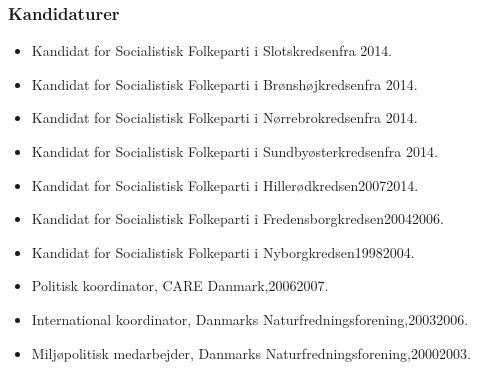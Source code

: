 \documentclass[11pt, a4paper]{awesome-cv}
\begin{document}
\begin{cvletter}
\subsubsection*{Kandidaturer}
\begin{itemize}
\item Kandidat for Socialistisk Folkeparti i Slotskredsenfra 2014.
\item Kandidat for Socialistisk Folkeparti i Brønshøjkredsenfra 2014.
\item Kandidat for Socialistisk Folkeparti i Nørrebrokredsenfra 2014.
\item Kandidat for Socialistisk Folkeparti i Sundbyøsterkredsenfra 2014.
\item Kandidat for Socialistisk Folkeparti i Hillerødkredsen20072014.
\item Kandidat for Socialistisk Folkeparti i Fredensborgkredsen20042006.
\item Kandidat for Socialistisk Folkeparti i Nyborgkredsen19982004.
\end{itemize}
\begin{itemize}
\item Politisk koordinator, CARE Danmark,20062007.
\item International koordinator, Danmarks Naturfredningsforening,20032006.
\item Miljøpolitisk medarbejder, Danmarks Naturfredningsforening,20002003.
\end{itemize}
\end{cvletter}
\end{document}
